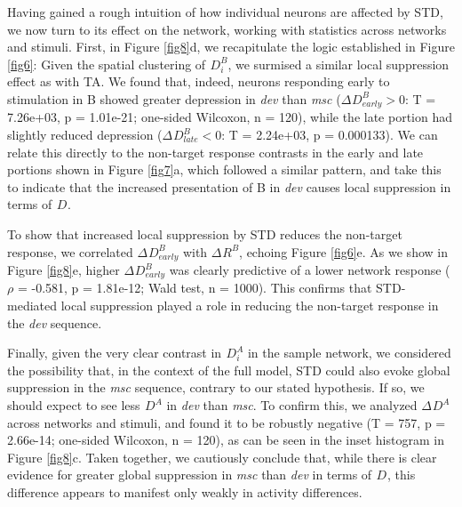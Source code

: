 \documentclass[pdflatex,referee,iicol,sn-basic]{sn-jnl}
\newcommand{\dev}{\textit{dev}}
\newcommand{\msc}{\textit{msc}}
\renewcommand{\R}[3][]{{}^{#1}_{}\!R^{#2}_{#3}}
\newcommand{\D}[3][]{{}^{#1}_{}\!D^{#2}_{#3}}
\theoremstyle{thmstyleone}%
\theoremstyle{thmstyletwo}%
\theoremstyle{thmstylethree}%
\begin{document}
Having gained a rough intuition of how individual neurons are affected by STD, we now turn to its effect on the network, working with statistics across networks and stimuli. First, in Figure \ref{fig8}d, we recapitulate the logic established in Figure \ref{fig6}: Given the spatial clustering of $\D{B}{i}$, we surmised a similar local suppression effect as with TA. We found that, indeed, neurons responding early to stimulation in B showed greater depression in \dev{} than \msc{} ($\Delta \D{B}{early} > 0$: T = 7.26e+03, p = 1.01e-21; one-sided Wilcoxon, n = 120), while the late portion had slightly reduced depression ($\Delta \D{B}{late} < 0$: T = 2.24e+03, p = 0.000133). We can relate this directly to the non-target response contrasts in the early and late portions shown in Figure \ref{fig7}a, which followed a similar pattern, and take this to indicate that the increased presentation of B in \dev{} causes local suppression in terms of $\D{}{}$. %

To show that increased local suppression by STD reduces the non-target response, we correlated $\Delta \D{B}{early}$ with $\Delta \R{B}{}$, echoing Figure \ref{fig6}e. As we show in Figure \ref{fig8}e, higher $\Delta \D{B}{early}$ was clearly predictive of a lower network response ($\rho$ = -0.581, p = 1.81e-12; Wald test, n = 1000). This confirms that STD-mediated local suppression played a role in reducing the non-target response in the \dev{} sequence.

Finally, given the very clear contrast in $\D{A}{i}$ in the sample network, we considered the possibility that, in the context of the full model, STD could also evoke global suppression in the \msc{} sequence, contrary to our stated hypothesis. If so, we should expect to see less $\D{A}{}$ in \dev{} than \msc{}. To confirm this, we analyzed $\Delta \D{A}{}$ across networks and stimuli, and found it to be robustly negative (T = 757, p = 2.66e-14; one-sided Wilcoxon, n = 120), as can be seen in the inset histogram in Figure \ref{fig8}c. Taken together, we cautiously conclude that, while there is clear evidence for greater global suppression in \msc{} than \dev{} in terms of $\D{}{}$, this difference appears to manifest only weakly in activity differences.
\end{document}
